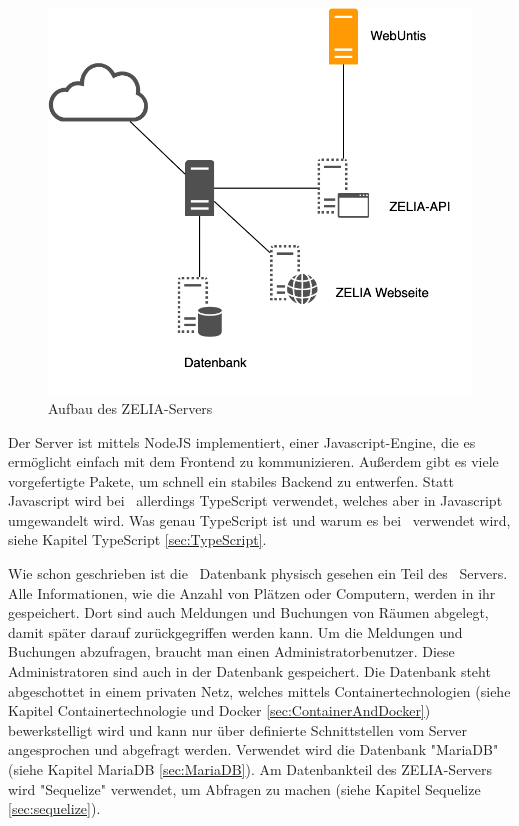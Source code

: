 \begin{figure}[H]
    \centering
    \includegraphics[width=120mm]{./media/Intro/server_arch.png}
    \caption{Aufbau des ZELIA-Servers}
\end{figure}

Der Server ist mittels NodeJS implementiert, einer Javascript-Engine, die es ermöglicht einfach mit dem Frontend zu kommunizieren. Außerdem gibt es viele vorgefertigte Pakete, um schnell ein stabiles Backend zu entwerfen. Statt Javascript wird bei \ZELIA\ allerdings TypeScript verwendet, welches aber in Javascript umgewandelt wird. Was genau TypeScript ist und warum es bei \ZELIA\ verwendet wird, siehe Kapitel TypeScript \ref{sec:TypeScript}.


Wie schon geschrieben ist die \ZELIA\ Datenbank physisch gesehen ein Teil des \ZELIA\ Servers. Alle Informationen, wie die Anzahl von Plätzen oder Computern, werden in ihr gespeichert. Dort sind auch Meldungen und Buchungen von Räumen abgelegt, damit später darauf zurückgegriffen werden kann. Um die Meldungen und Buchungen abzufragen, braucht man einen Administratorbenutzer. Diese Administratoren sind auch in der Datenbank gespeichert. Die Datenbank steht abgeschottet in einem privaten Netz, welches mittels Containertechnologien (siehe Kapitel Containertechnologie und Docker \ref{sec:ContainerAndDocker}) bewerkstelligt wird und kann nur über definierte Schnittstellen vom Server angesprochen und abgefragt werden. Verwendet wird die Datenbank "MariaDB" (siehe Kapitel MariaDB \ref{sec:MariaDB}). Am Datenbankteil des ZELIA-Servers wird "Sequelize" verwendet, um Abfragen zu machen (siehe Kapitel Sequelize \ref{sec:sequelize}).


